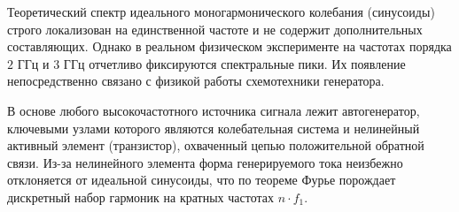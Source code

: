 Теоретический спектр идеального моногармонического колебания (синусоиды) строго локализован на единственной частоте и не содержит дополнительных составляющих. Однако в реальном физическом эксперименте на частотах порядка $2\text{ ГГц}$ и $3\text{ ГГц}$ отчетливо фиксируются спектральные пики. Их появление непосредственно связано с физикой работы схемотехники генератора.

В основе любого высокочастотного источника сигнала лежит автогенератор, ключевыми узлами которого являются колебательная система и нелинейный активный элемент (транзистор), охваченный цепью положительной обратной связи. Из-за нелинейного элемента форма генерируемого тока неизбежно отклоняется от идеальной синусоиды, что по теореме Фурье порождает дискретный набор гармоник на кратных частотах $n \cdot f_1$.

